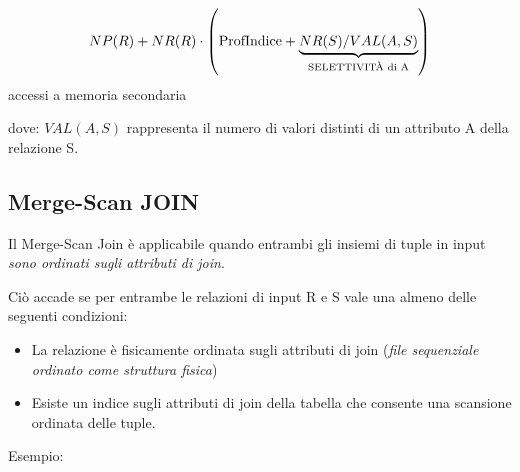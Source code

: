 \documentclass[a4paper, 10pt]{article}
\theoremstyle{definition}
\begin{document}
		\[
			NP(R) + NR(R) \cdot \left( \textup{ProfIndice} + \underbrace{NR(S)/VAL(A,S)}_{\textup{SELETTIVITÀ di A}} \right)
		\]
		accessi a memoria secondaria
		\noindent
		
		dove: $ VAL(A,S) $ rappresenta il numero di valori distinti di un
		attributo A della relazione S.
		
	\subsection*{Merge-Scan JOIN}
		Il Merge-Scan Join è applicabile quando entrambi gli
		insiemi di tuple in input \textit{sono ordinati sugli attributi di
		join}.
	
		\noindent
		Ciò accade se per entrambe le relazioni di input R e S
		vale una almeno delle seguenti condizioni:
		\begin{itemize}
			\item La relazione è fisicamente ordinata sugli attributi di
			join (\textit{file sequenziale ordinato come struttura fisica})
			\item Esiste un indice sugli attributi di join della tabella che
			consente una scansione ordinata delle tuple.
		\end{itemize}
		
	\newpage
		
		Esempio:
		
\end{document}
